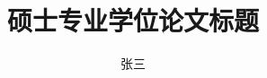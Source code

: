 \documentclass[degree=master, academic=false]{nwputhesis}
\title{硕士专业学位论文标题}{Professional Master Thesis Title}
\author{张三}{San Zhang}
\begin{document}
\START
\showoutput

\maketitle

\clearpage
\OMIT
\end{document}
